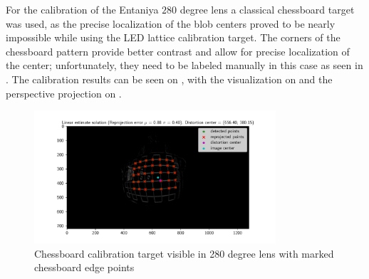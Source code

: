 For the calibration of the Entaniya $280$ degree lens a classical chessboard target was used, as the precise localization of the blob centers proved to be nearly impossible while using the \ac{LED} lattice calibration target. The corners of the chessboard pattern provide
better contrast and allow for precise localization of the center; unfortunately, they need to be labeled manually in this case as seen in .
The calibration results can be seen on , with the visualization on  and the perspective projection on
.
\begin{figure}[htbp]
	\centering
        \includegraphics[width=0.8\textwidth]{./fig/pgfplot/build/chessboard_280.pdf}
	\caption{Chessboard calibration target visible in 280 degree lens with marked chessboard edge points}
	\label{fig:calib_ent_label}
\end{figure}

